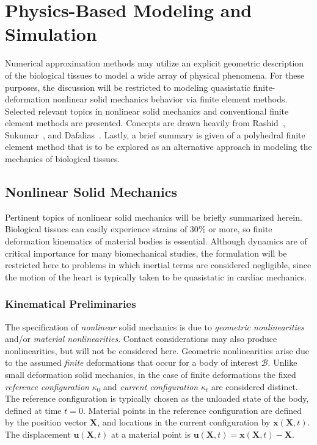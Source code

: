 \chapter{Physics-Based Modeling and Simulation}
\label{chap:4}
%

Numerical approximation methods may utilize an explicit geometric description of the biological tissues to model a wide array of physical phenomena. For these purposes, the discussion will be restricted to modeling quasistatic finite-deformation nonlinear solid mechanics behavior via finite element methods. Selected relevant topics in nonlinear solid mechanics and conventional finite element methods are presented. Concepts are drawn heavily from Rashid~\cite{rashid_2017, rashid_289, rashid_212, rashid_201}, Sukumar~\cite{suku_212}, and Dafalias~\cite{dafalias_205}. Lastly, a brief summary is given of a polyhedral finite element method that is to be explored as an alternative approach in modeling the mechanics of biological tissues.

\section{Nonlinear Solid Mechanics}
\label{Nonlinear Solid Mechanics}

Pertinent topics of nonlinear solid mechanics will be briefly summarized herein. Biological tissues can easily experience strains of 30$\%$ or more, so finite deformation kinematics of material bodies is essential. Although dynamics are of critical importance for many biomechanical studies, the formulation will be restricted here to problems in which inertial terms are considered negligible, since the motion of the heart is typically taken to be quasistatic in cardiac mechanics.

\subsection{Kinematical Preliminaries}

The specification of \textit{nonlinear} solid mechanics is due to \textit{geometric nonlinearities} and/or \textit{material nonlinearities}. Contact considerations may also produce nonlinearities, but will not be considered here. Geometric nonlinearities arise due to the assumed \textit{finite} deformations that occur for a body of interest $\mathcal{B}$. Unlike small deformation solid mechanics, in the case of finite deformations the fixed \textit{reference configuration} $\kappa_0$ and \textit{current configuration} $\kappa_t$ are considered distinct. The reference configuration is typically chosen as the unloaded state of the body, defined at time $t=0$. Material points in the reference configuration are defined by the position vector $\bm{X}$, and locations in the current configuration by $\bm{x}(\bm{X},t)$. The displacement $\bm{u}(\bm{X},t)$ at a material point is $\bm{u}(\bm{X},t) = \bm{x}(\bm{X},t) - \bm{X}$.

